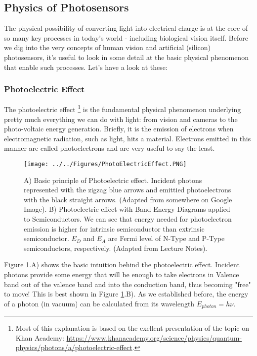 \subsection{Physics of Photosensors}

The physical possibility of converting light into electrical charge is at the core of so many key processes in today's world - including biological vision itself. Before we dig into the very concepts of human vision and artificial (silicon) photosensors, it's useful to look in some detail at the basic physical phenomenon that enable such processes. Let's have a look at these:

\subsubsection{Photoelectric Effect}

The photoelectric effect \footnote{Most of this explanation is based on the exellent presentation of the topic on Khan Academy: \url{https://www.khanacademy.org/science/physics/quantum-physics/photons/a/photoelectric-effect}.} is the fundamental physical phenomenon underlying pretty much everything we can do with light: from vision and cameras to the photo-voltaic energy generation. Briefly, it is the emission of electrons when electromagnetic radiation, such as light, hits a material. Electrons emitted in this manner are called photoelectrons and are very useful to say the least. 

\begin{figure}[H]
    \centering
    \texttt{[image: ../../Figures/PhotoElectricEffect.PNG]}
    \caption{A) Basic principle of Photoelectric effect. Incident photons represented with the zigzag blue arrows and emittied photoelectrons with the black straight arrows. (Adapted from somewhere on Google Image). B) Photoelectric effect with Band Energy Diagrams applied to Semiconductors. We can see that energy needed for photoelectron emission is higher for intrinsic semiconductor than extrinsic semiconductor. $E_D$ and $E_A$ are Fermi level of N-Type and P-Type semiconductors, respectively. (Adapted from Lecture Notes).}
    \label{fig:PhotoElectricEffect}
\end{figure}

Figure \ref{fig:PhotoElectricEffect}.A) shows the basic intuition behind the photoelectric effect. Incident photons provide some energy that will be enough to take electrons in Valence band out of the valence band and into the conduction band, thus becoming "free" to move! This is best shown in Figure \ref{fig:PhotoElectricEffect}.B). As we established before, the energy of a photon (in vacuum) can be calculated from its wavelength $E_{photon} = h \nu$. 

